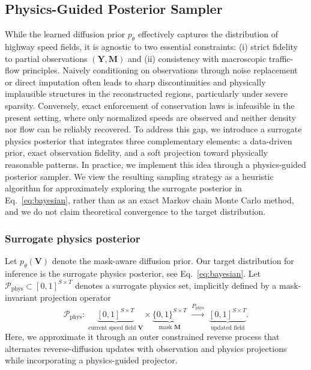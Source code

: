 \documentclass[a4paper,fleqn]{cas-sc}
\numberwithin{equation}{section}
\begin{document}
\subsection{Physics-Guided Posterior Sampler}
\label{sec:sampler}
While the learned diffusion prior $p_\theta$ effectively captures the distribution of highway speed fields, it is agnostic to two essential constraints: (i) strict fidelity to partial observations $(\mathbf Y,\mathbf M)$ and (ii) consistency with macroscopic traffic-flow principles. Naively conditioning on observations through noise replacement or direct imputation often leads to sharp discontinuities and physically implausible structures in the reconstructed regions, particularly under severe sparsity.
Conversely, exact enforcement of conservation laws is infeasible in the present setting, where only normalized speeds are observed and neither density nor flow can be reliably recovered.
To address this gap, we introduce a surrogate physics posterior that integrates three complementary elements: 
a data-driven prior, exact observation fidelity, and a soft projection toward physically reasonable patterns. In practice, we implement this idea through a physics-guided posterior sampler. We view the resulting sampling strategy as a heuristic algorithm for approximately exploring the surrogate posterior in Eq.~\eqref{eq:bayesian}, rather than as an exact Markov chain Monte Carlo method, and we do not claim theoretical convergence to the target distribution.

\subsubsection{Surrogate physics posterior}
Let $p_\theta(\mathbf V)$ denote the mask-aware diffusion prior. Our target distribution for inference is the surrogate physics posterior, see Eq.~\ref{eq:bayesian}. Let $\mathcal P_{\text{phys}}\subset[0,1]^{S\times T}$ denotes a surrogate physics set, implicitly defined by a mask-invariant projection operator
\begin{equation}
    \mathcal P_{\text{phys}}:\;
        \underbrace{[0,1]^{S\times T}}_{\text{current speed field }\mathbf V}
        \times
        \underbrace{\{0,1\}^{S\times T}}_{\text{mask }\mathbf M}
        \;\xrightarrow{ P_{\text{phys}}} \;
        \underbrace{[0,1]^{S\times T}}_{\text{updated field}}.
\end{equation}
Here, we approximate it through an outer constrained reverse process that alternates reverse-diffusion updates with observation and physics projections while incorporating a physics-guided projector.
\end{document}
